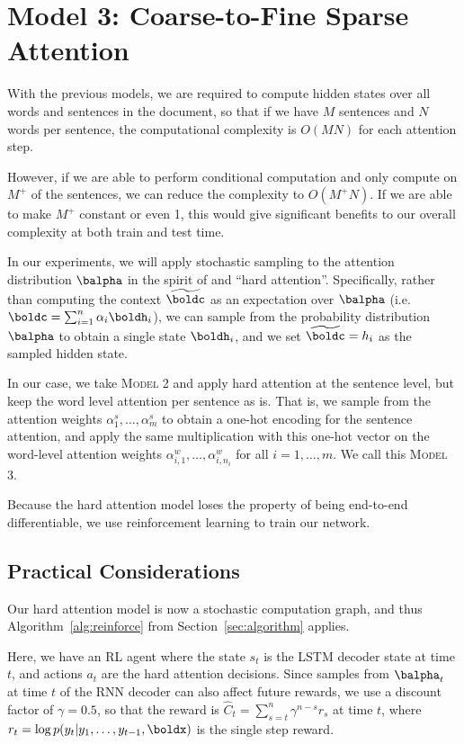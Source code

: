 \documentclass[12pt]{report}
\begin{document}
\section{Model 3: Coarse-to-Fine Sparse Attention}

With the previous models, we are required to compute hidden states over all words and sentences in the document, so that if we have $M$ sentences and $N$ words per sentence, the computational complexity is $O(MN)$ for each attention step.

However, if we are able to perform conditional computation and only compute on $M^+$ of the sentences, we can reduce the complexity to $O(M^+N)$. If we are able to make $M^+$ constant or even 1, this would give significant benefits to our overall complexity at both train and test time.

In our experiments, we will apply stochastic sampling to the attention distribution $\balpha$ in the spirit of \citet{xu2015captioning} and ``hard attention''.
Specifically, rather than computing the context $\widetilde{\boldc}$ as an expectation over $\balpha$ (i.e. $\boldc = \sum_{i=1}^n \alpha_i \boldh_i$), we can sample from the probability distribution $\balpha$ to obtain a single state $\boldh_i$, and we set $\widetilde{\boldc} = h_i$ as the sampled hidden state.

In our case, we take \textsc{Model 2} and apply hard attention at the sentence level, but keep the word level attention per sentence as is. That is, we sample from the attention weights $\alpha_1^s, \ldots, \alpha_m^s$ to obtain a one-hot encoding for the sentence attention, and apply the same multiplication with this one-hot vector on the word-level attention weights $\alpha_{i,1}^w, \ldots, \alpha_{i,n_i}^w$ for all $i = 1, \ldots, m$. We call this \textsc{Model 3}.


Because the hard attention model loses the property of being end-to-end differentiable, we use reinforcement learning to train our network.


\subsection{Practical Considerations}
\label{sec:practical}

Our hard attention model is now a stochastic computation graph, and thus Algorithm~\ref{alg:reinforce} from Section~\ref{sec:algorithm} applies.

Here, we have an RL agent where the state $s_t$ is the LSTM decoder state at time $t$, and actions $a_t$ are the hard attention decisions.
Since samples from $\balpha_t$ at time $t$ of the RNN decoder can also affect future rewards, we use a discount factor of $\gamma = 0.5$, so that the reward is $\hat{C}_t = \sum_{s = t}^n \gamma^{n-s}r_s$ at time $t$, where $r_t = \log p(y_t | y_1, \ldots, y_{t-1}, \boldx)$ is the single step reward.
\end{document}
